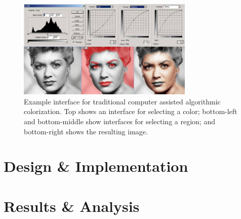 \begin{figure}
    \centering
    \includegraphics[width=0.75\textwidth]{images/colorization/computer_assisted_colorization.jpg}
    \caption{Example interface for traditional computer assisted algorithmic colorization. Top shows an interface for selecting a color; bottom-left and bottom-middle show interfaces for selecting a region; and bottom-right shows the resulting image.\cite{ColorizeBlackWhite}}
    \label{fig:computer_assisted_colorization}
\end{figure}

\section{Design \& Implementation}
\section{Results \& Analysis}
\blindtext
